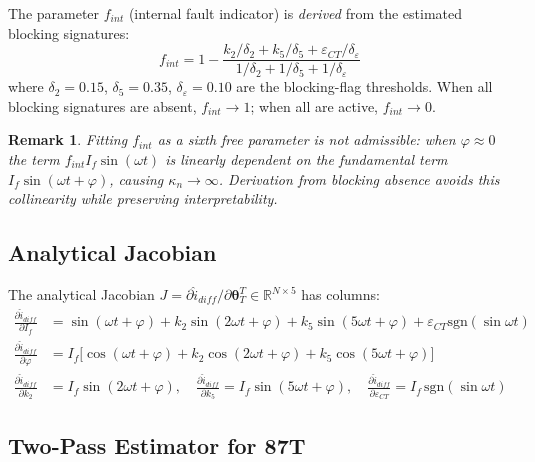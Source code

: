 \documentclass[12pt,a4paper]{article}
\newtheorem{remark}{Remark}[section]
\newcommand{\kappan}{\kappa_n}
\newcommand{\thetaT}{\boldsymbol{\theta}_T}
\begin{document}
The parameter $f_{int}$ (internal fault indicator) is \emph{derived}
from the estimated blocking signatures:
\begin{equation}
  f_{int} = 1 - \frac{k_2/\delta_2 + k_5/\delta_5 + \varepsilon_{CT}/\delta_\varepsilon}
                     {1/\delta_2 + 1/\delta_5 + 1/\delta_\varepsilon}
  \label{eq:fint_87T}
\end{equation}
where $\delta_2 = 0.15$, $\delta_5 = 0.35$, $\delta_\varepsilon = 0.10$ are
the blocking-flag thresholds.  When all blocking signatures are absent,
$f_{int} \to 1$; when all are active, $f_{int} \to 0$.

\begin{remark}
  Fitting $f_{int}$ as a sixth free parameter is \emph{not} admissible:
  when $\varphi \approx 0$ the term $f_{int} I_f \sin(\omega t)$ is
  linearly dependent on the fundamental term $I_f \sin(\omega t + \varphi)$,
  causing $\kappan \to \infty$.  Derivation from blocking absence avoids this
  collinearity while preserving interpretability.
\end{remark}

\subsection{Analytical Jacobian}
\label{sec:87T_jacobian}

The analytical Jacobian $J = \partial \hat{i}_{diff}/\partial\thetaT^T \in
\mathbb{R}^{N \times 5}$ has columns:
\begin{align}
  \frac{\partial\hat{i}_{diff}}{\partial I_f}
    &= \sin(\omega t+\varphi) + k_2\sin(2\omega t+\varphi)
       + k_5\sin(5\omega t+\varphi) + \varepsilon_{CT}\mathrm{sgn}(\sin\omega t)
  \label{eq:J_If}\\
  \frac{\partial\hat{i}_{diff}}{\partial \varphi}
    &= I_f\bigl[\cos(\omega t+\varphi)
       + k_2\cos(2\omega t+\varphi) + k_5\cos(5\omega t+\varphi)\bigr]
  \label{eq:J_phi}\\
  \frac{\partial\hat{i}_{diff}}{\partial k_2}
    &= I_f \sin(2\omega t+\varphi),\quad
  \frac{\partial\hat{i}_{diff}}{\partial k_5}
    = I_f \sin(5\omega t+\varphi),\quad
  \frac{\partial\hat{i}_{diff}}{\partial \varepsilon_{CT}}
    = I_f\,\mathrm{sgn}(\sin\omega t)
  \label{eq:J_rest}
\end{align}

\subsection{Two-Pass Estimator for 87T}
\label{sec:87T_estimator}
\end{document}
